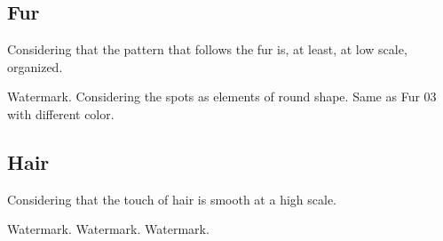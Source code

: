 \clearpage
\renewcommand{\mat}{Fur}
\subsection{\mat}
Considering that the pattern that follows the fur is, at least, at low scale, organized.

\renewcommand{\Number}{01}\InputImage{\sexor}{\tfu}{\sexor}{\tfu}{\sexdi}{\tfu}
{Watermark.}{}
\renewcommand{\Number}{02}\InputImage{\sexor}{\tfu}{\sexor}{\tfu}{\sexdi}{\tfu}
{}{}
\renewcommand{\Number}{03}\InputImage{\sexor}{\tfu}{\sexor}{\tfu}{\sro}{\tfu}
{}{Considering the spots as elements of round shape.}
\renewcommand{\Number}{04}\InputImage{\sexor}{\tfu}{\sexor}{\tfu}{\sexor}{\tfu}
{}{}
\renewcommand{\Number}{05}\InputImage{\sexor}{\tfu}{\sexor}{\tfu}{\sexdi}{\tfu}
{}{}
\renewcommand{\Number}{06}\InputImage{\sexor}{\tfu}{\sexor}{\tfu}{\sexdi}{\tfu}
{}{}
\renewcommand{\Number}{07}\InputImage{\sexor}{\tfu}{\sexdi}{\tfu}{\sexdi}{\tfu}
{}{}
\renewcommand{\Number}{08}\InputImage{\sexor}{\tfu}{\sexor}{\tfu}{\sexdi}{\tfu}
{}{}
\renewcommand{\Number}{09}\InputImage{\sexor}{\tfu}{\sexdi}{\tfu}{\sexdi}{\tfu}
{}{}
\renewcommand{\Number}{10}\InputImage{\sexor}{\tfu}{\sexor}{\tfu}{\sexdi}{\tfu}
{}{}
\renewcommand{\Number}{11}\InputImage{\sexor}{\tfu}{\sexor}{\tfu}{\sro}{\tfu}
{Same as Fur 03 with different color.}{}
\renewcommand{\Number}{12}\InputImage{\sexor}{\tfu}{\sexor}{\tfu}{\sexdi}{\tfu}
{}{}

\clearpage
\renewcommand{\mat}{Hair}
\subsection{\mat}
Considering that the touch of hair is smooth at a high scale.

\renewcommand{\Number}{01}\InputImage{\sexor}{\tbu}{\sexor}{\tsm}{\sexdi}{\tsm}
{Watermark.}{}
\renewcommand{\Number}{02}\InputImage{\sexor}{\tbu}{\sexdi}{\tsm}{\sexdi}{\tsm}
{Watermark.}{}
\renewcommand{\Number}{03}\InputImage{\sexor}{\tbu}{\sexor}{\tsm}{\sexdi}{\tsm}
{}{}
\renewcommand{\Number}{04}\InputImage{\sexor}{\tbu}{\sexor}{\tsm}{\sexdi}{\tsm}
{}{}
\renewcommand{\Number}{05}\InputImage{\sexor}{\tbu}{\sexor}{\tsm}{\sexor}{\tsm}
{}{}
\renewcommand{\Number}{06}\InputImage{\sexor}{\tbu}{\sexor}{\tsm}{\sexor}{\tsm}
{}{}
\renewcommand{\Number}{07}\InputImage{\sexor}{\tbu}{\sexor}{\tsm}{\sexdi}{\tsm}
{}{}
\renewcommand{\Number}{08}\InputImage{\sexor}{\tbu}{\sexdi}{\tsm}{\sexdi}{\tsm}
{}{}
\renewcommand{\Number}{09}\InputImage{\sexor}{\tbu}{\sexor}{\tsm}{\sexdi}{\tsm}
{}{}
\renewcommand{\Number}{10}\InputImage{\sexor}{\tbu}{\sexor}{\tsm}{\sexdi}{\tsm}
{Watermark.}{}
\renewcommand{\Number}{11}\InputImage{\sexor}{\tbu}{\sexor}{\tsm}{\sexor}{\tsm}
{}{}
\renewcommand{\Number}{12}\InputImage{\sexor}{\tbu}{\sexor}{\tsm}{\sexdi}{\tsm}
{}{}

